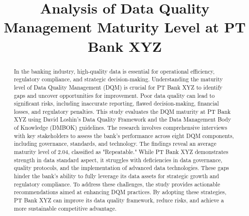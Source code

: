 \documentclass[conference]{IEEEtran}
\begin{document}
\title{Analysis of Data Quality Management Maturity Level at PT Bank XYZ\\
}

\author{

\and
{}

\and
{}
}

\maketitle

\begin{abstract}
In the banking industry, high-quality data is essential for operational efficiency, regulatory compliance, and strategic decision-making. Understanding the maturity level of Data Quality Management (DQM) is crucial for PT Bank XYZ to identify gaps and uncover opportunities for improvement. Poor data quality can lead to significant risks, including inaccurate reporting, flawed decision-making, financial losses, and regulatory penalties. This study evaluates the DQM maturity at PT Bank XYZ using David Loshin’s Data Quality Framework and the Data Management Body of Knowledge (DMBOK) guidelines.
The research involves comprehensive interviews with key stakeholders to assess the bank's performance across eight DQM components, including governance, standards, and technology. The findings reveal an average maturity level of 2.04, classified as "Repeatable." While PT Bank XYZ demonstrates strength in data standard aspect, it struggles with deficiencies in data governance, quality protocols, and the implementation of advanced data technologies. These gaps hinder the bank’s ability to fully leverage its data assets for strategic growth and regulatory compliance.
To address these challenges, the study provides actionable recommendations aimed at enhancing DQM practices. By adopting these strategies, PT Bank XYZ can improve its data quality framework, reduce risks, and achieve a more sustainable competitive advantage.
\end{abstract}
\end{document}
